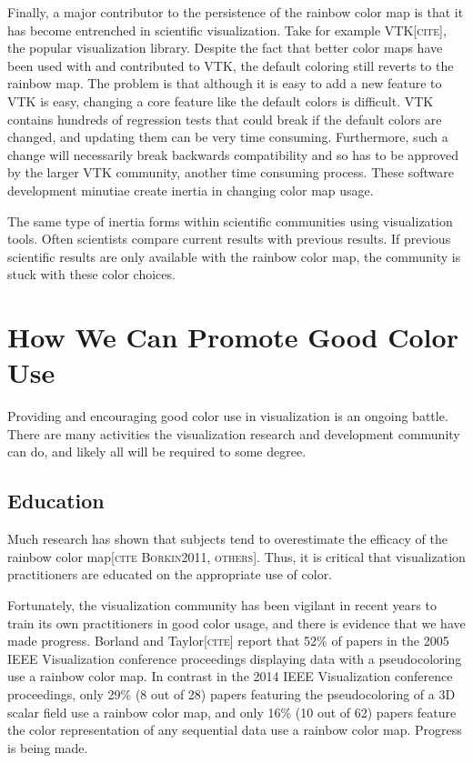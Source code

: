 \documentclass[letterpaper,twocolumn,fleqn]{article}
\newcommand{\fix}[1]{{\color{red}\textsc{[#1]}}}
\begin{document}
\noindent
Finally, a major contributor to the persistence of the rainbow color map is
that it has become entrenched in scientific visualization. Take for example
VTK\fix{cite}, the popular visualization library. Despite the fact that
better color maps have been used with and contributed to VTK, the default
coloring still reverts to the rainbow map. The problem is that although it
is easy to add a new feature to VTK is easy, changing a core feature like
the default colors is difficult. VTK contains hundreds of regression tests
that could break if the default colors are changed, and updating them can
be very time consuming. Furthermore, such a change will necessarily break
backwards compatibility and so has to be approved by the larger VTK
community, another time consuming process. These software development
minutiae create inertia in changing color map usage.

The same type of inertia forms within scientific communities using
visualization tools. Often scientists compare current results with previous
results. If previous scientific results are only available with the rainbow
color map, the community is stuck with these color choices.


\section{How We Can Promote Good Color Use}

\noindent
Providing and encouraging good color use in visualization is an ongoing
battle. There are many activities the visualization research and
development community can do, and likely all will be required to some
degree.

\subsection{Education}

\noindent
Much research has shown that subjects tend to overestimate the efficacy of
the rainbow color map\fix{cite Borkin2011, others}. Thus, it is critical
that visualization practitioners are educated on the appropriate use of
color.

Fortunately, the visualization community has been vigilant in recent years
to train its own practitioners in good color usage, and there is evidence
that we have made progress. Borland and Taylor\fix{cite} report that 52\%
of papers in the 2005 IEEE Visualization conference proceedings displaying
data with a pseudocoloring use a rainbow color map. In contrast in the
2014 IEEE Visualization conference proceedings, only 29\% (8 out of 28)
papers featuring the pseudocoloring of a 3D scalar field use a rainbow
color map, and only 16\% (10 out of 62) papers feature the color
representation of any sequential data use a rainbow color map. Progress is
being made.
\end{document}
